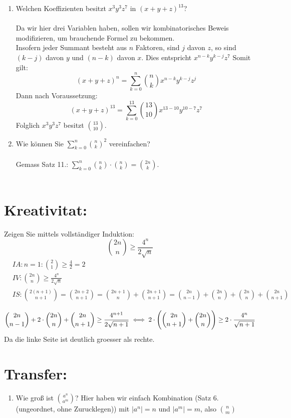 \begin{enumerate}[label=(\alph*)]
        \item Welchen Koeffizienten besitzt $x^3y^3z^7$ in $(x+y+z)^{13}$?\\\\
        Da wir hier drei Variablen haben, sollen wir kombinatorisches Beweis modifizieren, um 
        brauchende Formel zu bekommen.\\
        Insofern jeder Summant besteht aus $n$ Faktoren, sind $j$ davon $z$, so sind $(k-j)$ davon $y$ 
        und $(n-k)$ davon $x$. Dies entspricht $x^{n-k}y^{k-j}z^7$
        Somit gilt:
        \[(x+y+z)^{n} = \sum_{k=0}^{n} \binom{n}{k}x^{n-k}y^{k-j}z^j\]
        Dann nach Voraussetzung: 
        \[(x+y+z)^{13} = \sum_{k=0}^{13} \binom{13}{10}x^{13-10}y^{10-7}z^7\]
        Folglich $x^3y^3z^7$ besitzt $\binom{13}{10}$.

        \item Wie können Sie $\sum_{k=0}^n \binom{n}{k}^2$ vereinfachen?\\\\
        Gemass Satz 11.: $\sum_{k=0}^n \binom{n}{k}\cdot\binom{n}{k} = \binom{2n}{k}$.\\\\
    \end{enumerate}
    
    \section*{Kreativitat:} 
    Zeigen Sie mittels vollständiger Induktion:
    \[\binom{2n}{n}\geq \frac{4^n}{2\sqrt n}\]
    \begin{align*}
            &IA: n=1: \binom{2}{1}\geq \frac{4}{2} = 2\\ %
            &IV: \binom{2n}{n}\geq \frac{4^n}{2\sqrt n}\\
            &IS: \binom{2(n+1)}{n+1}=\binom{2n+2}{n+1}
            = \binom{2n+1}{n} + \binom{2n+1}{n+1}
            = \binom{2n}{n-1} + \binom{2n}{n} + \binom{2n}{n} + \binom{2n}{n+1}\\
    \end{align*}
    \[\binom{2n}{n-1} + 2\cdot\binom{2n}{n} + \binom{2n}{n+1} \geq \frac{4^{n+1}}{2\sqrt {n+1}}\\
            \iff 2\cdot\Bigg(\binom{2n}{n+1} + \binom{2n}{n}\Bigg) \geq 2\cdot\frac{4^n}{\sqrt {n+1}}\\\]
            Da die linke Seite ist deutlich groesser als rechte.
    \section*{Transfer:}
    \begin{enumerate}[label=(\alph*)]
    \item Wie groß ist $\binom{a^n}{a^m}$?
    Hier haben wir einfach Kombination (Satz 6. (ungeordnet, ohne Zurucklegen)) mit $|a^n| = n$ und 
    $|a^m| = m$, also $\binom{n}{m}$
    \end{enumerate} 
